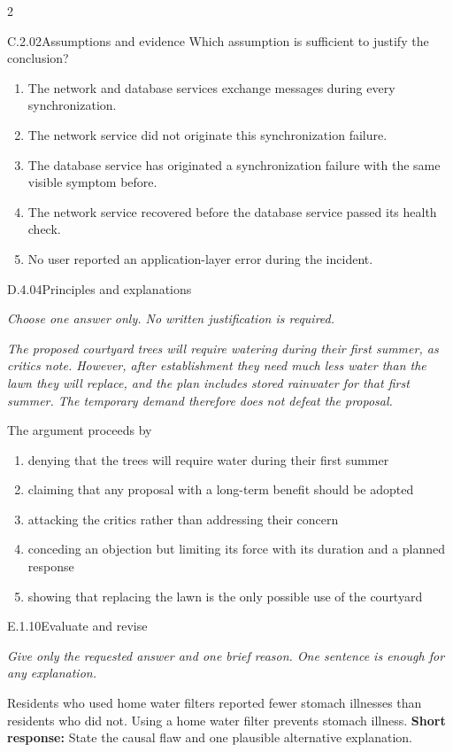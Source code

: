 \documentclass[9pt]{extarticle}
\newcommand{\choice}[1]{\item #1}
\begin{document}
\begin{multicols}{2}
\begin{DenseCoreProblem}{C.2.02}{Assumptions and evidence}
Which assumption is sufficient to justify the conclusion?
\begin{enumerate}[label=(\alph*)]
  \choice{The network and database services exchange messages during every synchronization.}
  \choice{The network service did not originate this synchronization failure.}
  \choice{The database service has originated a synchronization failure with the same visible symptom before.}
  \choice{The network service recovered before the database service passed its health check.}
  \choice{No user reported an application-layer error during the incident.}
\end{enumerate}
\end{DenseCoreProblem}
\begin{DenseCoreProblem}{D.4.04}{Principles and explanations}
{\scriptsize\textit{Choose one answer only. No written justification is required.}\par}
\emph{The proposed courtyard trees will require watering during their first summer, as critics note. However, after establishment they need much less water than the lawn they will replace, and the plan includes stored rainwater for that first summer. The temporary demand therefore does not defeat the proposal.}

The argument proceeds by
\begin{enumerate}[label=(\alph*)]
  \choice{denying that the trees will require water during their first summer}
  \choice{claiming that any proposal with a long-term benefit should be adopted}
  \choice{attacking the critics rather than addressing their concern}
  \choice{conceding an objection but limiting its force with its duration and a planned response}
  \choice{showing that replacing the lawn is the only possible use of the courtyard}
\end{enumerate}
\end{DenseCoreProblem}
\begin{DenseCoreProblem}{E.1.10}{Evaluate and revise}
{\scriptsize\textit{Give only the requested answer and one brief reason. One sentence is enough for any explanation.}\par}
Residents who used home water filters reported fewer stomach illnesses than residents who did not. Using a home water filter prevents stomach illness.
\textbf{Short response:} State the causal flaw and one plausible alternative explanation.
\end{DenseCoreProblem}
\end{multicols}
\CoreWorkArea
\FormBreak
{}
\end{document}
